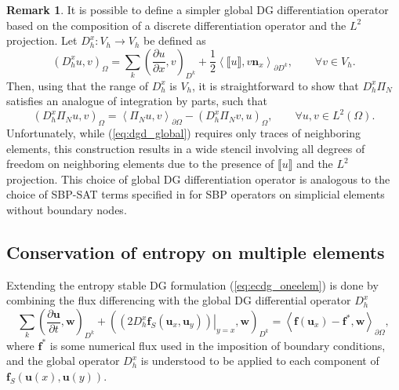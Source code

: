 \documentclass[preprint,10pt]{article}
\theoremstyle{definition}
\theoremstyle{lemma}
\newtheorem*{remark}{Remark}
\theoremstyle{theorem}
\theoremstyle{assumption}
\newcommand{\pd}[2]{\frac{\partial#1}{\partial#2}}
\newcommand{\LRp}[1]{\left( #1 \right)}
\newcommand{\LRa}[1]{\left\langle #1 \right\rangle}
\newcommand{\jump}[1] {\ensuremath{\llbracket#1\rrbracket}}
\renewcommand{\L}{L^2\LRp{\Omega}}
\newcommand{\note}[1]{{\color{blue}{#1}}}
\begin{document}
\begin{remark}
It is possible to define a simpler global DG differentiation operator based on the composition of a discrete differentiation operator and the $L^2$ projection.  Let ${D}^x_h: V_h\rightarrow V_h$ be defined as
\[
\LRp{D^x_h u,v}_{\Omega} = \sum_k \LRp{\pd{u}{x},v}_{D^k} + \frac{1}{2}\LRa{\jump{u},v\bm{n}_x}_{\partial D^k}, \qquad \forall v \in V_h.
\]
Then, using that the range of $D^x_h$ is $V_h$, it is straightforward to show that $D^x_h \Pi_N$ satisfies an analogue of integration by parts, such that
\[
\LRp{D^x_h\Pi_N u, v}_{\Omega} = \LRa{\Pi_N u,v}_{\partial \Omega} - \LRp{D^x_h\Pi_N v, u}_{\Omega}, \qquad \forall u,v\in \L.
\]
Unfortunately, while (\ref{eq:dgd_global}) requires only traces of neighboring elements, this construction results in a wide stencil involving all degrees of freedom on neighboring elements due to the presence of $\jump{u}$ and the $L^2$ projection.  This choice of global DG differentiation operator is analogous to the choice of SBP-SAT terms specified in \cite{fernandez2016simultaneous} for SBP operators on simplicial elements without boundary nodes.  
\end{remark}


\note{It's currently unclear how to distinguish whether different operators are high order accurate. }

\note{Kopriva's note ``Stability of Overintegration Methods for Nodal Discontinuous Galerkin Spectral Element Methods'' does not apply here, because the formulation is entropy stable for any quadratures which evaluate $P^N$ exactly (assuming affine meshes!).  Certain terms are under-integrated, but they do not contribute to the interplay between volume and surface terms described by Kopriva.}

\subsection{Conservation of entropy on multiple elements}

Extending the entropy stable DG formulation (\ref{eq:ecdg_oneelem}) is done by combining the flux differencing with the global DG differential operator $D^x_h$
\begin{equation}
\sum_{k}\LRp{\pd{\bm{u}}{t},\bm{w}}_{D^k} + \LRp{\left.\LRp{2D^x_h\bm{f}_S(\bm{u}_x,\bm{u}_y)}\right|_{y=x},\bm{w}}_{D^k} = \LRa{\bm{f}(\bm{u}_x)-\bm{f}^*,\bm{w}}_{\partial \Omega},
\label{eq:ecdg}
\end{equation}
where $\bm{f}^*$ is some numerical flux used in the imposition of boundary conditions, and the global operator $D^x_h$ is understood to be applied to each component of $\bm{f}_S\LRp{\bm{u}(x),\bm{u}(y)}$.  
\end{document}
